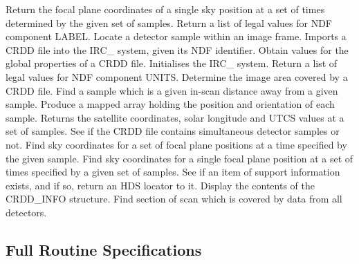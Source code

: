     {Return the focal plane coordinates of a single sky position at a set of
     times determined by the given set of samples.}
   {Return a list of legal values for NDF component LABEL.}
   {Locate a detector sample within an image frame.}
   {Imports a CRDD file into the IRC\_ system, given its NDF identifier.}
   {Obtain values for the global properties of a CRDD file. }
   {Initialises the IRC\_ system.}
   {Return a list of legal values for NDF component UNITS.}
   {Determine the image area covered by a CRDD file.}
   {Find a sample which is a given in-scan distance away from a given sample.}
   {Produce a mapped array holding the position and orientation of each sample.}
   {Returns the satellite coordinates, solar longitude and UTCS values at a 
    set of samples.}
   {See if the CRDD file contains simultaneous detector samples or not.}
   {Find sky coordinates for a set of focal plane positions at a time specified 
    by the given sample.}
   {Find sky coordinates for a single focal plane position at a set of times
    specified by a given set of samples.}
   {See if an item of support information exists, and if so, return an HDS 
    locator to it.}
   {Display the contents of the CRDD\_INFO structure.}
   {Find section of scan which is covered by data from all detectors.}

\subsection {Full Routine Specifications}
\newlength{\sstbannerlength}
\newlength{\sstcaptionlength}

